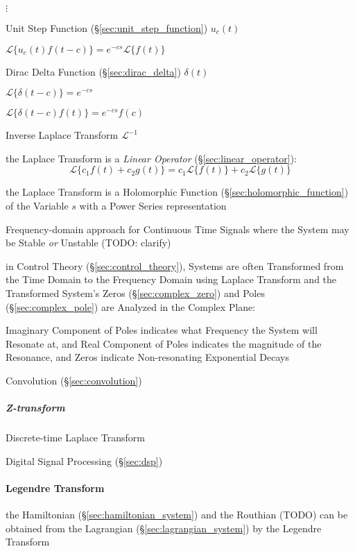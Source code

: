$\vdots$

Unit Step Function (\S\ref{sec:unit_step_function}) $u_c(t)$

$\mathcal{L}\{ u_c(t)f(t-c) \} = e^{-cs}\mathcal{L}\{f(t)\}$

Dirac Delta Function (\S\ref{sec:dirac_delta}) $\delta(t)$

$\mathcal{L}\{ \delta(t-c) \} = e^{-cs}$

$\mathcal{L}\{ \delta(t-c)f(t) \} = e^{-cs}f(c) $

Inverse Laplace Transform $\mathcal{L}^{-1}$

the Laplace Transform is a \emph{Linear Operator}
(\S\ref{sec:linear_operator}):
\[
  \mathcal{L} \{ c_1 f(t) + c_2 g(t) \}
    = c_1\mathcal{L}\{f(t)\} + c_2\mathcal{L}\{g(t)\}
\]

the Laplace Transform is a Holomorphic Function
(\S\ref{sec:holomorphic_function}) of the Variable $s$ with a Power Series
representation

Frequency-domain approach for Continuous Time Signals where the System may be
Stable \emph{or} Unstable (TODO: clarify)

in Control Theory (\S\ref{sec:control_theory}), Systems are often Transformed
from the Time Domain to the Frequency Domain using Laplace Transform and the
Transformed System's Zeros (\S\ref{sec:complex_zero}) and Poles
(\S\ref{sec:complex_pole}) are Analyzed in the Complex Plane:

Imaginary Component of Poles indicates what Frequency the System will Resonate
at, and Real Component of Poles indicates the magnitude of the Resonance, and
Zeros indicate Non-resonating Exponential Decays

Convolution (\S\ref{sec:convolution})



\subparagraph{Z-transform}\label{sec:z_transform}

Discrete-time Laplace Transform

Digital Signal Processing (\S\ref{sec:dsp})



\paragraph{Legendre Transform}\label{sec:legendre_transform}\hfill

the Hamiltonian (\S\ref{sec:hamiltonian_system}) and the Routhian (TODO) can be
obtained from the Lagrangian (\S\ref{sec:lagrangian_system}) by the Legendre
Transform



